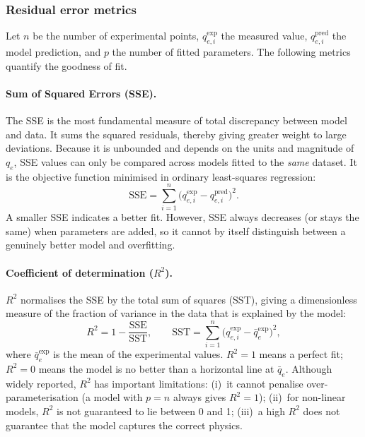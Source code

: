 \documentclass[12pt]{article}
\begin{document}
	\subsubsection{Residual error metrics}

	Let $n$ be the number of experimental points,
	$q_{e,i}^{\exp}$ the measured value,
	$q_{e,i}^{\mathrm{pred}}$ the model prediction, and $p$ the
	number of fitted parameters. The following metrics quantify the
	goodness of fit.

	\paragraph{Sum of Squared Errors (SSE).}
	The SSE is the most fundamental measure of total discrepancy
	between model and data. It sums the squared residuals, thereby
	giving greater weight to large deviations. Because it is
	unbounded and depends on the units and magnitude of $q_e$, SSE
	values can only be compared across models fitted to the
	\emph{same} dataset. It is the objective function minimised in
	ordinary least-squares regression:
	\begin{equation}
		\mathrm{SSE}
		= \sum_{i=1}^{n}
		\bigl(q_{e,i}^{\exp} - q_{e,i}^{\mathrm{pred}}\bigr)^{2}.
		\label{eq:SSE}
	\end{equation}
	A smaller SSE indicates a better fit. However, SSE always
	decreases (or stays the same) when parameters are added, so it
	cannot by itself distinguish between a genuinely better model and
	overfitting.

	\paragraph{Coefficient of determination ($R^{2}$).}
	$R^{2}$ normalises the SSE by the total sum of squares (SST),
	giving a dimensionless measure of the fraction of variance in the
	data that is explained by the model:
	\begin{equation}
		R^{2} = 1 - \frac{\mathrm{SSE}}{\mathrm{SST}},
		\qquad
		\mathrm{SST} = \sum_{i=1}^{n}
		\bigl(q_{e,i}^{\exp} - \bar{q}_e^{\exp}\bigr)^{2},
		\label{eq:R2}
	\end{equation}
	where $\bar{q}_e^{\exp}$ is the mean of the experimental values.
	$R^{2} = 1$ means a perfect fit; $R^{2} = 0$ means the model
	is no better than a horizontal line at $\bar{q}_e$. Although
	widely reported, $R^{2}$ has important limitations: (i)~it cannot
	penalise over-parameterisation (a model with $p = n$ always
	gives $R^{2} = 1$); (ii)~for non-linear models, $R^{2}$ is not
	guaranteed to lie between 0 and 1; (iii)~a high $R^{2}$ does not
	guarantee that the model captures the correct physics.
\end{document}
